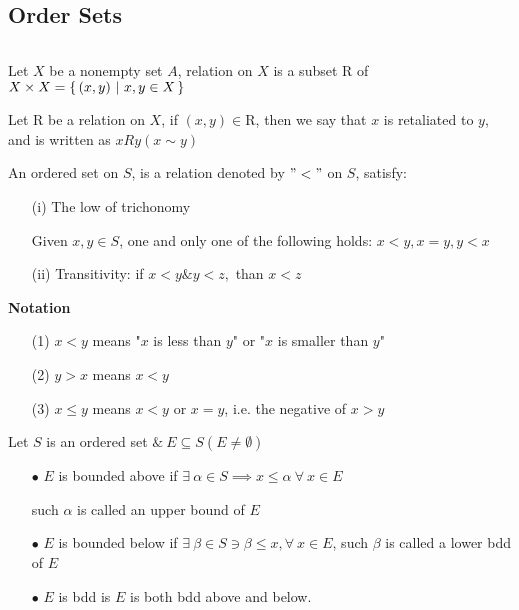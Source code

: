 \newpage

\subsection{Order Sets}

\begin{defn}[Relation]$ $


	Let $X$ be a nonempty set $A$, relation on $X$ is a subset $\mathrm{R}$ of $X \times X = \left\{ \,(x,y)~|~x,y \in X \,\right\}$
	
	Let $\mathrm{R}$ be a relation on $X$, if $(x,y) \in \mathrm{R}$, then we say that $x$ is retaliated to $y$, and is written as $xRy(x\sim y)$
\end{defn}

\begin{defn}
	An ordered set on $S$, is a relation denoted by $"<"$ on $S$, satisfy:
	
	\begin{enumerate}
		\item[(i)] The low of trichonomy
		
		Given $x,y \in S$, one and only one of the following holds: $x<y,x=y,y<x$
		
		\item[(ii)] Transitivity: if $x < y \& y < z,$ than $x<z$
	\end{enumerate} 
	
	\begin{tcolorbox}
		\textbf{Notation}
		\begin{enumerate}
			\item[(1)] $x<y$ means "$x$ is less than $y$" or "$x$ is smaller than $y$"
			\item[(2)] $y > x$ means $x<y$
			\item[(3)] $x \leq y$ means $x < y$ or $x = y$, i.e. the negative of $x > y$
		\end{enumerate}
	\end{tcolorbox}
	
	
\end{defn}



\begin{defn}
	Let $S$ is an ordered set $\&~ E \subseteq S(E \neq \emptyset)$
	
	\begin{enumerate}
		\item[$\bullet$] $E$ is bounded above if $\exists~ \alpha \in S \implies x \leq \alpha~\forall ~x \in E$
		
		such $\alpha$ is called an upper bound of $E$
		 
		\item[$\bullet$] $E$ is bounded below if $\exists~ \beta \in S \ni \beta \leq x, \forall~x\in E$, such $\beta$ is called a lower bdd of $E$
		\item[$\bullet$] $E$ is bdd is $E$ is both bdd above and below. 
	\end{enumerate}
\end{defn}

